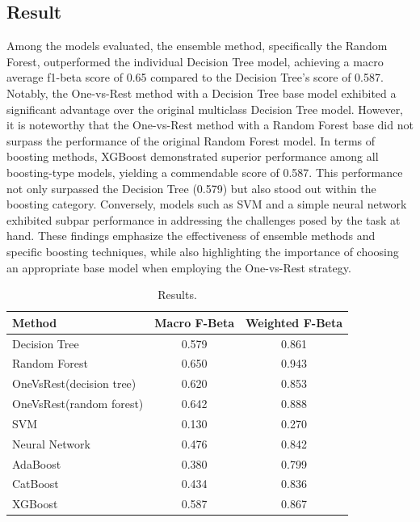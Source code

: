 \documentclass[10pt,twocolumn,letterpaper]{article}
\begin{document}
\begin{CJK}{UTF8}{bsmi}
\subsection{Result}
Among the models evaluated, the ensemble method, specifically the Random Forest, outperformed the individual Decision Tree model, achieving a macro average f1-beta score of 0.65 compared to the Decision Tree's score of 0.587. Notably, the One-vs-Rest method with a Decision Tree base model exhibited a significant advantage over the original multiclass Decision Tree model. However, it is noteworthy that the One-vs-Rest method with a Random Forest base did not surpass the performance of the original Random Forest model.
In terms of boosting methods, XGBoost demonstrated superior performance among all boosting-type models, yielding a commendable score of 0.587. This performance not only surpassed the Decision Tree (0.579) but also stood out within the boosting category. Conversely, models such as SVM and a simple neural network exhibited subpar performance in addressing the challenges posed by the task at hand. These findings emphasize the effectiveness of ensemble methods and specific boosting techniques, while also highlighting the importance of choosing an appropriate base model when employing the One-vs-Rest strategy.
\begin{table}
  \centering
  \begin{tabular}{@{}lc c@{}}
    \toprule
    Method & Macro F-Beta & Weighted F-Beta \\
    \midrule
    Decision Tree & 0.579 & 0.861 \\
    Random Forest & 0.650 & 0.943 \\
    OneVsRest(decision tree) & 0.620 & 0.853 \\
    OneVsRest(random forest) & 0.642 & 0.888 \\
    SVM & 0.130 & 0.270 \\
    Neural Network & 0.476 & 0.842 \\
    AdaBoost & 0.380 & 0.799 \\
    CatBoost & 0.434 & 0.836 \\
    XGBoost & 0.587 & 0.867 \\
    \bottomrule
  \end{tabular}
  \caption{Results.}
  \label{tab:example}
\end{table}


\end{CJK}
\end{document}
